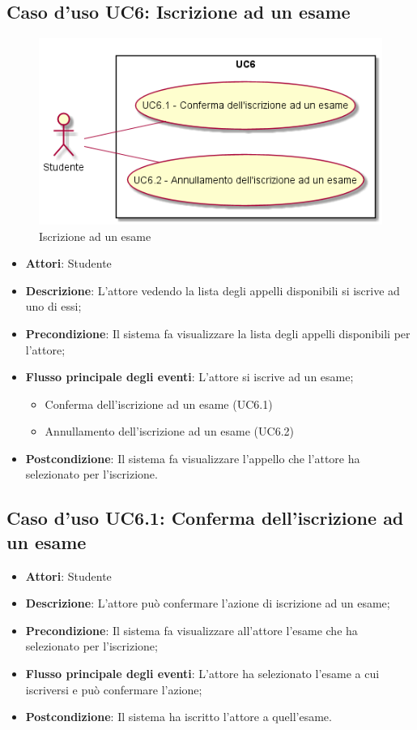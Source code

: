 \subsection{Caso d'uso \texorpdfstring{UC6}{UC6}: Iscrizione ad un esame}
\begin{figure} [H]
\centering
\includegraphics[scale=0.45]{./img/UC6.png}
\caption{Iscrizione ad un esame}\label{}
\end{figure}
\begin{itemize}
\item \textbf{Attori}: Studente
\item \textbf{Descrizione}: L'attore vedendo la lista degli appelli disponibili si iscrive ad uno di essi;
\item \textbf{Precondizione}: Il sistema fa visualizzare la lista degli appelli disponibili per l'attore;
\item \textbf{Flusso principale degli eventi}: L'attore si iscrive ad un esame;
\begin{itemize}
\item Conferma dell'iscrizione ad un esame (UC6.1)
\item Annullamento dell'iscrizione ad un esame (UC6.2)
\end{itemize}
\item \textbf{Postcondizione}: Il sistema fa visualizzare l'appello che l'attore ha selezionato per l'iscrizione.
\end{itemize}
\subsection{Caso d'uso \texorpdfstring{UC6.1}{UC6.1}: Conferma dell'iscrizione ad un esame}
\begin{itemize}
\item \textbf{Attori}: Studente
\item \textbf{Descrizione}: L'attore può confermare l'azione di iscrizione ad un esame;
\item \textbf{Precondizione}: Il sistema fa visualizzare all'attore l'esame che ha selezionato per l'iscrizione;
\item \textbf{Flusso principale degli eventi}: L'attore ha selezionato l'esame a cui iscriversi e può confermare l'azione;
\item \textbf{Postcondizione}: Il sistema ha iscritto l'attore a quell'esame.
\end{itemize}
